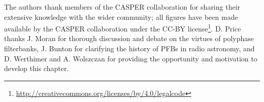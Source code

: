 \documentclass{ws-rv961x669}
\begin{document}
The authors thank members of the CASPER collaboration for sharing their extensive knowledge with the wider community; all figures have been made available by the CASPER collaboration under the CC-BY license\footnote{\url{http://creativecommons.org/licenses/by/4.0/legalcode}}. D. Price thanks J. Moran for thorough discussion and debate on the virtues of polyphase filterbanks, J. Bunton for clarifying the history of PFBs in radio astronomy, and D. Werthimer and A. Wolszczan for providing the opportunity and motivation to develop this chapter. 



\end{document}
